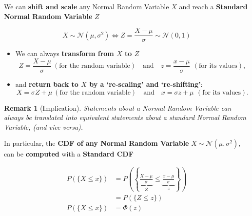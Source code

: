 \documentclass[smaller]{beamer}\usepackage[]{graphicx}\usepackage[]{color}
\newtheorem{remark}{Remark}[section]
\newcommand{\N}{\mathcal{N}}
\begin{document}
\begin{frame}{\secname}

We can \textbf{shift and scale} any Normal Random Variable $X$ and reach a \textbf{Standard Normal Random Variable} $Z$

$$X\sim \N\left( \mu ,\sigma ^{2}\right)\Longleftrightarrow Z=\frac{X-\mu}{\sigma}\sim \N\left( 0,1\right)$$

\pause

  \begin{itemize}
  \item We can always \textbf{transform from $X$ to $Z$}
  \begin{equation*}
  Z=\frac{X-\mu }{\sigma } \ (\text{for the random variable}) \quad\mbox{and}\quad z=\frac{x-\mu }{\sigma }\,  \ (\text{for its values}) ,
  \end{equation*}
  \item and \textbf{return back to $X$ by a `re-scaling' and `re-shifting'}:
  \begin{equation*}
  X=\sigma Z+\mu  \ (\text{for the random variable}) \quad\mbox{and}\quad x=\sigma z+\mu\, \ (\text{for its values}).
  \end{equation*}
  \end{itemize}
\pause

\begin{remark}[Implication]
Statements about a Normal Random Variable can always be translated into equivalent statements about a standard Normal Random Variable, (and vice-versa).
\end{remark}
\end{frame}

\begin{frame}{\secname}
  In particular, the \textbf{CDF of any Normal Random Variable} $X\sim \N(\mu, \sigma^2)$, can
  be \textbf{computed} with a \textbf{Standard CDF}

  \begin{align*}
  P(\{ X\leq x\}) &=
  P\left(\left\{\underbrace{\frac{X-\mu}{\sigma}}_Z\leq \underbrace{\frac{x-\mu}{\sigma}}_{z}\right\}\right) \\
  &= P(\{ Z\leq z\}) \\
  P(\{ X\leq x\})&= \Phi(z)
  \end{align*}
\end{frame}
\end{document}
